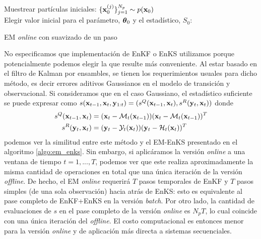 \begin{algorithm}[H]\label{algo:onlineEM_OSS}
    
    Muestrear partículas iniciales: $\{\mathbf{x}_0^{(j)}\}_{j=1}^{N_p} \sim p(\mathbf{x}_0)$ \\
    Elegir valor inicial para el parámetro, $\mbox{\boldmath$ \theta $}_0$ y el estadístico, $\widehat{S_0}$: \\
    \caption{EM \textit{online} con suavizado de un paso}
\end{algorithm}
No especificamos que implementación de EnKF o EnKS utilizamos porque potencialmente podemos elegir la que resulte más conveniente. Al estar basado en el filtro de Kalman por ensambles, se tienen los requerimientos usuales para dicho método, es decir errores aditivos Gaussianos en el modelo de transición y observacional. Si consideramos que en el caso Gaussiano, el estadístico suficiente 
se puede expresar como $s(\mathbf{x}_{t-1}, \mathbf{x}_t, \mathbf{y}_{1:t}) = (s^Q(\mathbf{x}_{t-1}, \mathbf{x}_t), s^R(\mathbf{y}_t, \mathbf{x}_t))$ donde
\begin{align*}
    s^Q(\mathbf{x}_{t-1}, \mathbf{x}_t) &= (\mathbf{x}_t - \mathcal{M}_t(\mathbf{x}_{t-1}))(\mathbf{x}_t - \mathcal{M}_t(\mathbf{x}_{t-1}))^T \\
    s^R(\mathbf{y}_t, \mathbf{x}_t) &= (\mathbf{y}_t - \mathcal{Y}_t(\mathbf{x}_t))(\mathbf{y}_t - \mathcal{H}_t(\mathbf{x}_t))^T
\end{align*}
podemos ver la similitud entre este método y el EM-EnKS presentado en el algoritmo \ref{algo:em_enks}. Sin embargo, si aplicáramos  la versión \textit{online} a una ventana de tiempo $t = 1, ..., T$, podemos ver que este realiza aproximadamente la misma cantidad de operaciones en total que una única iteración de la versión \textit{offline}. De hecho, el EM \textit{online} requerirá $T$ pasos temporales de EnKF y $T$ pasos simples (de una sola observación) hacia atrás de EnKS: esto es equivalente al pase completo de EnKF+EnKS en la versión \textit{batch}. Por otro lado, la cantidad de evaluaciones de $s$ en el pase completo de la versión \textit{online} es $N_p T$, lo cual coincide con una única iteración del \textit{offline}. El costo computacional es entonces menor para la versión \textit{online} y de aplicación más directa a sistemas secuenciales.

